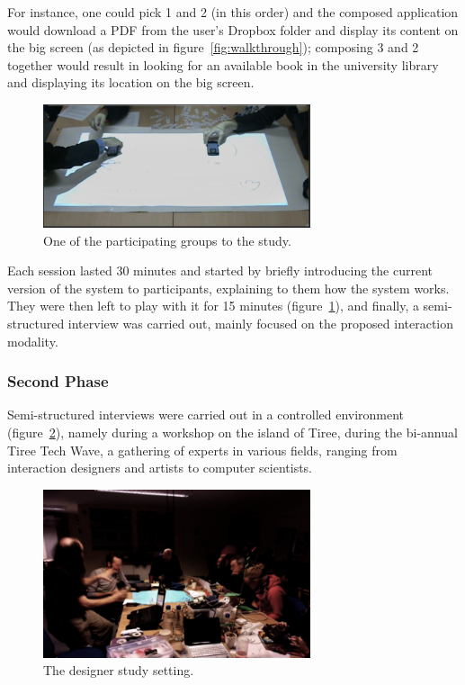 For instance, one could pick 1 and 2 (in this order) and the composed application would download a PDF from the user's Dropbox folder and display its content on the big screen (as depicted in figure~\ref{fig:walkthrough}); composing 3 and 2 together would result in looking for an available book in the university library and displaying its location on the big screen.

\begin{figure}[ht!]
\centering
\includegraphics[width=0.7\textwidth]{images/c4/studs.png}
\caption{One of the participating groups to the study.}\label{fig:studs}
\end{figure}

Each session lasted 30 minutes and started by briefly introducing the current version of the system to participants, explaining to them how the system works. They were then left to play with it for 15 minutes (figure~\ref{fig:studs}), and finally, a semi-structured interview was carried out, mainly focused on the proposed interaction modality.

\subsubsection{Second Phase}
Semi-structured interviews were carried out in a controlled environment (figure~\ref{fig:des}), namely during a workshop on the island of Tiree, during the bi-annual Tiree Tech Wave, a gathering of experts in various fields, ranging from interaction designers and artists to computer scientists.

\begin{figure}[ht!]
\centering
\includegraphics[width=0.7\textwidth]{images/c4/tiree.png}
\caption{The designer study setting.}\label{fig:des}
\end{figure}

